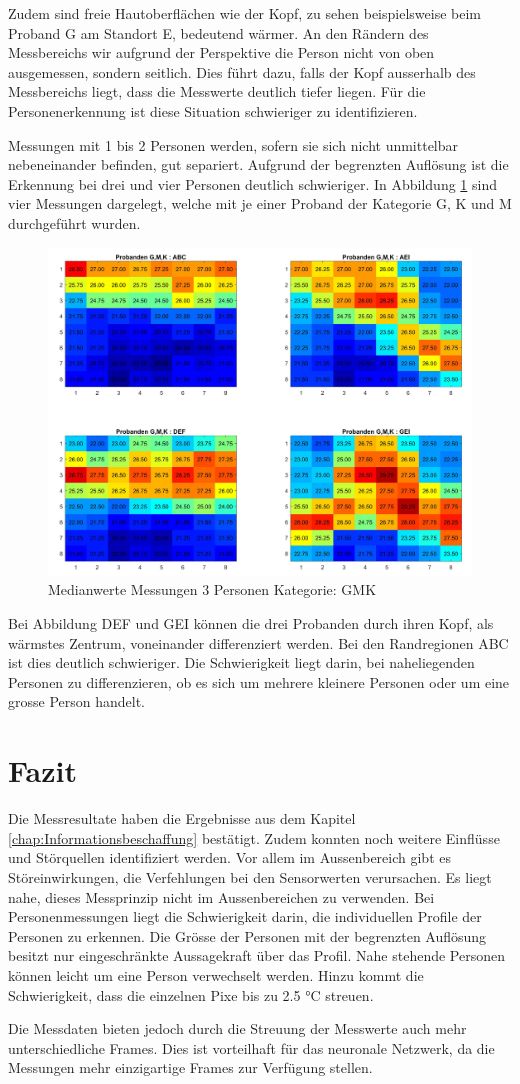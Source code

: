 Zudem sind freie Hautoberflächen wie der Kopf, zu sehen beispielsweise beim Proband G am Standort E, bedeutend wärmer. An den Rändern des Messbereichs wir aufgrund der Perspektive die Person nicht von oben ausgemessen, sondern seitlich. Dies führt dazu, falls der Kopf ausserhalb des Messbereichs liegt, dass die Messwerte deutlich tiefer liegen. Für die Personenerkennung ist diese Situation schwieriger zu identifizieren.

Messungen mit 1 bis 2 Personen werden, sofern sie sich nicht unmittelbar nebeneinander befinden, gut separiert. 
Aufgrund der begrenzten Auflösung ist die Erkennung bei drei und vier Personen deutlich schwieriger. In Abbildung \ref{fig:p33x3allpositons} sind vier Messungen dargelegt, welche mit je einer Proband der Kategorie G, K und M durchgeführt wurden.

\begin{figure}[H]
	\centering
	\includegraphics[width=0.8\linewidth]{fig/p3_kkg_4x4.jpg}
	\caption[Medianwerte aus Messungen mit 3 Personen der Kategorie: GMK]{Medianwerte Messungen 3 Personen Kategorie: GMK}
	\label{fig:p33x3allpositons}
\end{figure}


Bei Abbildung DEF und GEI können die drei Probanden durch ihren Kopf, als wärmstes Zentrum, voneinander differenziert werden. Bei den Randregionen ABC ist dies deutlich schwieriger. Die Schwierigkeit liegt darin, bei naheliegenden Personen zu differenzieren, ob es sich um mehrere kleinere Personen oder um eine grosse Person handelt.


\section{Fazit}
Die Messresultate haben die Ergebnisse aus dem Kapitel \ref{chap:Informationsbeschaffung} bestätigt. Zudem konnten noch weitere Einflüsse und Störquellen identifiziert werden. Vor allem im Aussenbereich gibt es Störeinwirkungen, die Verfehlungen bei den Sensorwerten verursachen. Es liegt nahe, dieses Messprinzip nicht im Aussenbereichen zu verwenden.
Bei Personenmessungen liegt die Schwierigkeit darin, die individuellen Profile der Personen zu erkennen. Die Grösse der Personen mit der begrenzten Auflösung besitzt nur eingeschränkte Aussagekraft über das Profil. Nahe stehende Personen können leicht um eine Person verwechselt werden. Hinzu kommt die Schwierigkeit, dass die einzelnen Pixe bis zu 2.5 °C streuen. 

Die Messdaten bieten jedoch durch die Streuung der Messwerte auch mehr unterschiedliche Frames. Dies ist vorteilhaft für das neuronale Netzwerk, da die Messungen mehr einzigartige Frames zur Verfügung stellen.